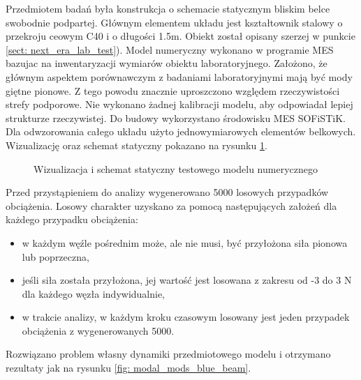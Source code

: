 Przedmiotem badań była konstrukcja o schemacie statycznym bliskim belce swobodnie podpartej. Głównym elementem układu jest kształtownik stalowy o przekroju ceowym C40 i o długości 1.5m. Obiekt został opisany szerzej w punkcie \ref{sect: next_era_lab_test}).  Model numeryczny wykonano w programie MES bazujac na inwentaryzacji wymiarów obiektu laboratoryjnego. Założono, że głównym aspektem porównawczym z badaniami laboratoryjnymi mają być mody giętne pionowe. Z tego powodu znacznie uproszczono względem rzeczywistości strefy podporowe. Nie wykonano żadnej kalibracji modelu, aby odpowiadał lepiej strukturze rzeczywistej. Do budowy wykorzystano środowisku MES SOFiSTiK. Dla odwzorowania całego układu użyto jednowymiarowych elementów belkowych. Wizualizację oraz schemat statyczny pokazano na rysunku \ref{fig: test_beam_wis_model}.
\begin{figure}[h]
	\centering
	\captionsetup{justification=centering}
	\caption{Wizualizacja i schemat statyczny testowego modelu numerycznego}
	\label{fig: test_beam_wis_model}
\end{figure}




Przed przystąpieniem do analizy wygenerowano 5000 losowych przypadków obciążenia. Losowy charakter uzyskano za pomocą następujących założeń dla każdego przypadku obciążenia:
\begin{itemize}
	\item w każdym węźle pośrednim może, ale nie musi, być przyłożona siła pionowa lub poprzeczna,
	\item jeśli siła została przyłożona, jej wartość jest losowana z zakresu od -3 do 3 N dla każdego węzła indywidualnie,
	\item w trakcie analizy, w każdym kroku czasowym losowany jest jeden przypadek obciążenia z wygenerowanych 5000.
\end{itemize}
Rozwiązano problem własny dynamiki przedmiotowego modelu i otrzymano rezultaty jak na rysunku \ref{fig: modal_mods_blue_beam}.

